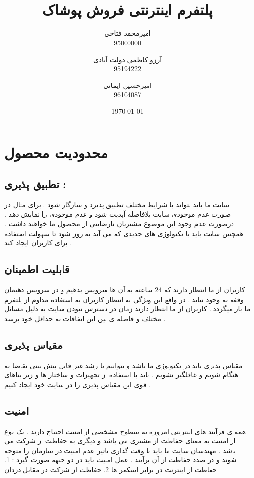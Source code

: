 \documentclass[12pt,onecolumn,a4paper]{article}
\begin{document}
\title{ \\ پلتفرم اینترنتی فروش پوشاک}
\author{امیرمحمد فتاحی\\95000000 \and آرزو کاظمی دولت آبادی \\95194222 \and امیرحسین ایمانی\\96104087}
\date{\today}
\maketitle

\newpage
\tableofcontents
\newpage
\listoffigures
\newpage


\section{محدودیت محصول}
\subsection{تطبیق پذیری :}

سایت ما باید بتواند با شرایط مختلف تطبیق پذیرد و سازگار شود . برای مثال در صورت عدم موجودی سایت بلافاصله آپدیت شود و عدم موجودی را نمایش دهد . درصورت عدم وجود این موضوع مشتریان نارضایتی از محصول ما خواهند داشت . همچنین سایت باید با تکنولوژی های جدیدی که می آید به روز شود تا سهولت استفاده برای کاربران ایجاد کند .
\subsection{قابلیت اطمینان }
کاربران از ما انتظار دارند که 24 ساعته به آن ها سرویس بدهیم و در سرویس دهیمان وقفه به وجود نیاید . در واقع این ویژگی به انتظار کاربران به استفاده مداوم از پلتفرم ما باز میگردد . کاربران از ما انتظار دارند زمان در دسترس نبودن سایت به دلیل مسائل مختلف و فاصله ی بین این اتفاقات به حداقل خود برسد .

\subsection{مقیاس پذیری }
مقیاس پذیری باید در تکنولوژی ما باشد و بتوانیم با رشد غیر قابل پیش بینی تقاضا به هنگام شویم و غافلگیر نشویم . باید با استفاده از تجهیزات و ساختار ها و زیر بناهای قوی این مقیاس پذیری را در سایت خود ایجاد کنیم .

\subsection{امنیت}
همه ی فرآیند های اینترنتی امروزه به سطوح مشخصی از امنیت احتیاج دارند . یک نوع از امنیت به معنای حفاظت از مشتری می باشد و دیگری به حفاظت از شرکت می باشد . مهندسان سایت ما باید با وقت گذاری تاثیر عدم امنیت در سازمان را متوجه شوند و در صدد حفاظت از آن برآیند .  عمل امنیت باید در دو جبهه صورت گیرد : 1. حفاظت از اینترنت در برابر اسکمر ها 2. حفاظت از شرکت در مقابل دزدان
\end{document}
